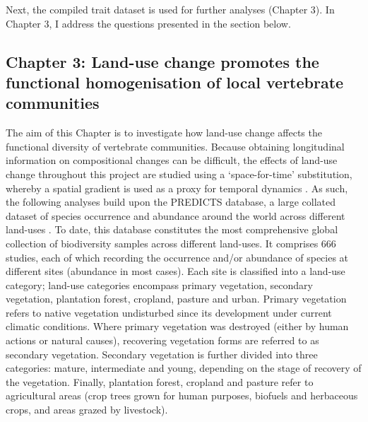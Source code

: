 Next, the compiled trait dataset is used for further analyses (Chapter 3). In Chapter 3, I address the questions presented in the section below.

\subsection{Chapter 3: Land-use change promotes the functional homogenisation of local vertebrate communities}

The aim of this Chapter is to investigate how land-use change affects the functional diversity of vertebrate communities. Because obtaining longitudinal information on compositional changes can be difficult, the effects of land-use change throughout this project are studied using a ‘space-for-time’ substitution, whereby a spatial gradient is used as a proxy for temporal dynamics \citep{depalma2018}. As such, the following analyses  build upon the PREDICTS database, a large collated dataset of species occurrence and abundance around the world across different land-uses \citep{Hudson2014, Hudson2017}. To date, this database constitutes the most comprehensive global collection of biodiversity samples across different land-uses. It comprises 666 studies, each of which recording the occurrence and/or abundance  of species at different sites (abundance in most cases). Each site is classified into a land-use category; land-use categories encompass primary vegetation, secondary vegetation, plantation forest, cropland, pasture and urban. Primary vegetation refers to native vegetation undisturbed since its development under current climatic conditions. Where primary vegetation was destroyed (either by human actions or natural causes), recovering vegetation forms are referred to as secondary vegetation. Secondary vegetation is further divided into three categories: mature, intermediate and young, depending on the stage of recovery of the vegetation.
Finally, plantation forest, cropland and pasture refer to agricultural areas (crop trees grown for human purposes, biofuels and herbaceous crops, and areas grazed by livestock).

